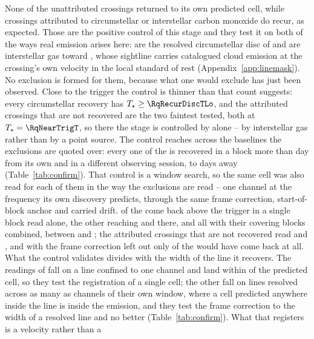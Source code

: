 None of the unattributed crossings returned to its own predicted cell, while
\MkAttrRecur{} crossings attributed to circumstellar or interstellar carbon
monoxide do recur, as expected. Those \MkAttrRecur{} are the positive control of this stage and they
test it on both of the ways real emission arises here: \RqNRecurDisc{} are the
resolved circumstellar disc of \RqRecurDiscStars{} and \RqNRecurCloud{} are
interstellar gas toward \RqRecurCloudStars, whose sightline carries catalogued
cloud emission at the crossing's own velocity in the local standard of rest
(Appendix~\ref{app:linemask}). No exclusion is formed for them, because what
one would exclude has just been observed. Close to the trigger the control is
thinner than that count suggests: every circumstellar recovery has
$T_\star\ge\RqRecurDiscTLo$, and the \RqNearTrigN{} attributed crossings that
are not recovered are the two faintest tested, both at
$T_\star=\RqNearTrigT$, so there the stage is controlled by
\RqRecurCloudStars{} alone -- by interstellar gas rather than by a point
source. The control reaches across the baselines the exclusions are quoted
over: every one of the \QcNCtl{} is recovered in a block more than \EpSep{}
day from its own and in a different observing session, \QcSepMinD{} to
\QcSepMaxD{} days away (Table~\ref{tab:confirm}).
That control is a window search, so the same cell was also read for each of
them in the way the exclusions are read -- one channel at the frequency its
own discovery predicts, through the same frame correction, start-of-block
anchor and carried drift. \RgNCtlSingle{} of the \RgNCtl{} come back above the trigger in a single block
read alone, the other \RgNCtlBelow{} reaching \RgCtlLoOne{} and
\RgCtlLoTwo{} there, and all \RgNCtl{} with their covering blocks combined,
between \LrTrepLo{} and \LrTrepHi; the \LrNAbs{} attributed crossings that are
not recovered read \LrAbsHi{} and \LrAbsLo, and with the frame correction left
out only \LrNoFrameCtl{} of the \LrNCtl{} would have come back at all. What
the control validates divides with the width of the line it recovers. The
\RgRegNUnres{} readings of \RgRegStar{} fall on a line confined to one channel
and land within \RgRegMaxCh{} of the predicted cell, so they test the
registration of a single cell; the other \RgRegNRes{} fall on lines resolved
across as many as \RgResFwhmChMax{} channels of their own window, where a cell
predicted anywhere inside the line is inside the emission, and they test the
frame correction to the width of a resolved line and no better
(Table~\ref{tab:confirm}). What that registers is a velocity rather than a
